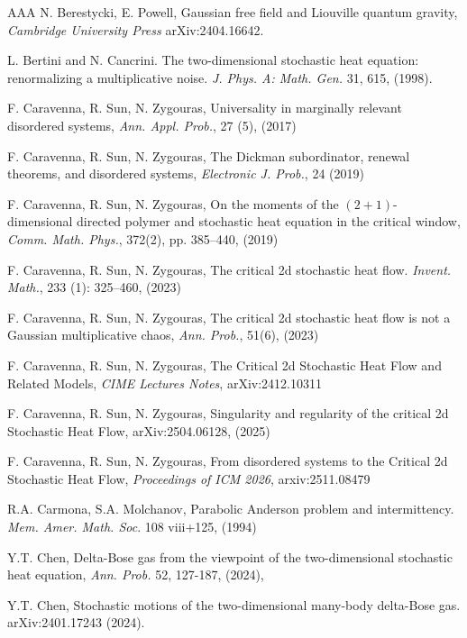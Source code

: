 \documentclass[a4paper,reqno,11pt]{amsart}
\numberwithin{equation}{section}
\theoremstyle{mytheorem}
\begin{document}
{\begin{thebibliography}{AAA}
N. Berestycki,  E. Powell, 
Gaussian free field and Liouville quantum gravity,
{\em Cambridge University Press}
 arXiv:2404.16642.

L. Bertini and N. Cancrini.
The two-dimensional stochastic heat equation: renormalizing a multiplicative noise.
{\em J. Phys. A: Math. Gen.} 31, 615, (1998).

F. Caravenna, R. Sun, N. Zygouras,
Universality in marginally relevant disordered systems,
{\em Ann. Appl. Prob.}, 27 (5), (2017)

F. Caravenna, R. Sun, N. Zygouras,  
The Dickman subordinator, renewal theorems, and disordered systems,
{\em Electronic J. Prob.}, 24  (2019)

F. Caravenna, R. Sun, N. Zygouras,
On the moments of the $(2+1)$-dimensional directed polymer and stochastic heat equation in the critical window,
{\em Comm. Math. Phys.}, 372(2), pp. 385–440, (2019)  

F. Caravenna, R. Sun, N. Zygouras, 
The critical 2d stochastic heat flow. 
{\em Invent. Math.}, 233 (1): 325–460, (2023) 

F. Caravenna, R. Sun, N. Zygouras,
The critical 2d stochastic heat flow is not a Gaussian multiplicative chaos,
{\em Ann. Prob.}, 51(6), (2023)


F. Caravenna, R. Sun, N. Zygouras,
The Critical 2d Stochastic Heat Flow and Related Models, 
{\em CIME Lectures Notes}, arXiv:2412.10311

F. Caravenna, R. Sun, N. Zygouras,
Singularity and regularity of the critical 2d Stochastic Heat Flow, 
arXiv:2504.06128, (2025)


F. Caravenna, R. Sun, N. Zygouras,
From disordered systems to the Critical 2d Stochastic Heat Flow, 
{\em Proceedings of ICM 2026}, arxiv:2511.08479


R.A. Carmona, S.A. Molchanov,
 Parabolic Anderson problem and intermittency. 
 {\em Mem. Amer. Math. Soc}. 108 viii+125, (1994)
 

Y.T. Chen, 
Delta-Bose gas from the viewpoint of the two-dimensional stochastic heat equation,
{\em Ann. Prob.} 52, 127-187,  (2024),

Y.T. Chen, 
Stochastic motions of the two-dimensional many-body delta-Bose gas.
 arXiv:2401.17243 (2024).


\end{thebibliography}}
\end{document}
